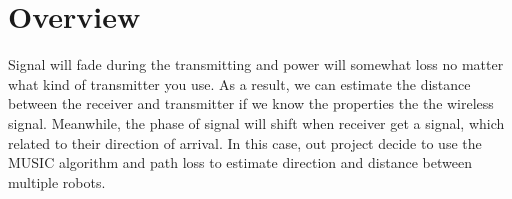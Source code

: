 \section{Overview}
\label{sec:overview}
	Signal will fade during the transmitting and power will somewhat loss no matter what kind of transmitter you use. As a result, we can estimate the distance between the receiver and transmitter if we know the properties the the wireless signal. Meanwhile, the phase of signal will shift when receiver get a signal, which related to their direction of arrival. In this case, out project decide to use the MUSIC algorithm and path loss to estimate direction and distance between multiple robots.


